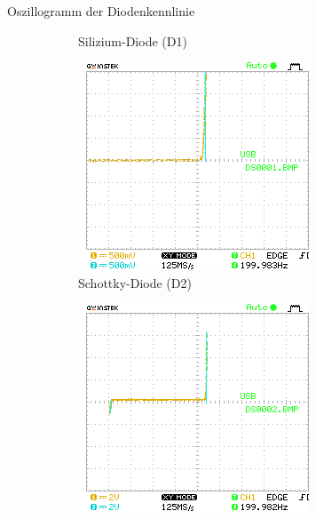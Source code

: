 \documentclass{article}
\theoremstyle{definition}
\begin{document}
\begin{aufgabe}{Oszillogramm der Diodenkennlinie}
\begin{figure}[H]
\begin{subfigure}[b]{0.45 \textwidth}
            \caption{Silizium-Diode (D1)}
            \label{a2_0}
        \end{subfigure}
        \hfill
        \begin{subfigure}[b]{0.45 \textwidth}
            \includegraphics[width=\textwidth]{MesswerteVersuch2/m2_1.png}
            \caption{Schottky-Diode (D2)}
            \label{a2_1}
        \end{subfigure}
        \hfill
        \begin{subfigure}[b]{0.45 \textwidth}
            \includegraphics[width=\textwidth]{MesswerteVersuch2/m2_2.png}

\end{subfigure}
\end{figure}
\end{aufgabe}
\end{document}
